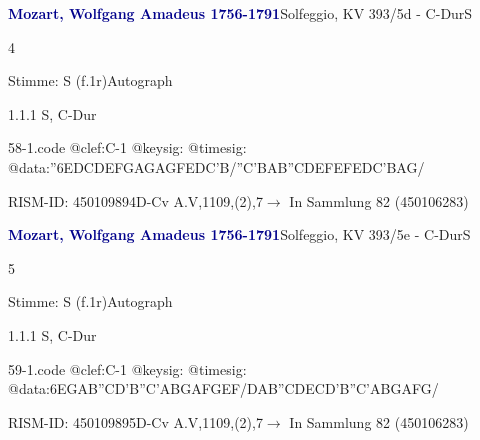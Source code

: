\documentclass[a4paper, twocolumn, 11pt]{book}
\begin{document}
\par \vspace{16pt} \textcolor{darkblue}{\textbf{Mozart, Wolfgang Amadeus  1756-1791}}\hfillplus{[58]}\newline Solfeggio, KV 393/5d - C-Dur\newline S
\par \begin{itshape} 4\end{itshape} 
\par \textcolor{darkblue}{}  Stimme: S  (f.1r)\newline Autograph
\par 1.1.1  S, C-Dur  
\begin{filecontents*}{58-1.code}
@clef:C-1
@keysig:
@timesig:
@data:''{6EDCD}{EFGA}{GAGF}{EDC'B}/{''C'BAB}{''CDEF}{EFED}{C'BAG}/
\end{filecontents*}
\newline %
\par RISM-ID: 450109894\newline D-Cv  A.V,1109,(2),7\newline $\rightarrow$ In Sammlung 82 (450106283)
      
\par \vspace{16pt} \textcolor{darkblue}{\textbf{Mozart, Wolfgang Amadeus  1756-1791}}\hfillplus{[59]}\newline Solfeggio, KV 393/5e - C-Dur\newline S
\par \begin{itshape} 5\end{itshape} 
\par \textcolor{darkblue}{}  Stimme: S  (f.1r)\newline Autograph
\par 1.1.1  S, C-Dur  
\begin{filecontents*}{59-1.code}
@clef:C-1
@keysig:
@timesig:
@data:6{EGAB}{''CD'B''C}{'ABGA}{FGEF}/{DAB''C}{DECD}{'B''C'AB}{GAFG}/
\end{filecontents*}
\newline %
\par RISM-ID: 450109895\newline D-Cv  A.V,1109,(2),7\newline $\rightarrow$ In Sammlung 82 (450106283)
      
\end{document}
